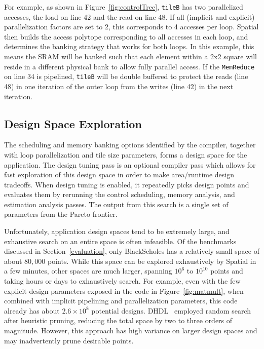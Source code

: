 {For example, as shown in Figure~\ref{fig:controlTree}, \texttt{\small{tileB}} has two parallelized accesses, the load on line 42 and the read on line 48. If all (implicit and explicit) parallelization factors are set to 2, this corresponds to 4 accesses per loop. Spatial then builds the access polytope corresponding to all accesses in each loop, and determines the banking strategy that works for both loops. In this example, this means the SRAM will be banked such that each element within a 2x2 square will reside
in a different physical bank to allow fully parallel access. If the \texttt{\small{MemReduce}} on line 34 is pipelined, \texttt{\small{tileB}} will be double buffered to protect the reads (line 48) in one iteration of the outer loop
from the writes (line 42) in the next iteration.







\subsection{Design Space Exploration}
\label{dse}
The scheduling and memory banking options identified by the compiler, together with loop parallelization and tile size parameters, forms a design space for the application.
The design tuning pass is an optional compiler pass which allows for fast exploration of this design space in order to make area/runtime design tradeoffs.
When design tuning is enabled, it repeatedly picks design points and evaluates them by rerunning the control scheduling, memory analysis, and estimation analysis passes. The output from this search is a single set of parameters from the Pareto frontier.

Unfortunately, application design spaces tend to be extremely large, and exhaustive search on an entire space is often infeasible. Of the benchmarks discussed in Section~\ref{evaluation},
only BlackScholes has a relatively small space of about $80,000$ points. While this space can be explored exhaustively by Spatial in a few minutes, other spaces are much larger, spanning $10^6$ to $10^{10}$ points and
taking hours or days to exhaustively search. For example, even with the few explicit design parameters exposed in the code in Figure~\ref{fig:matmult}, when combined with implicit pipelining and parallelization parameters, this code already has about $2.6\times10^8$ potential designs.
DHDL~\cite{dhdl} employed random search after heuristic pruning, reducing the total space by two to three orders of magnitude. However, this approach has high variance on larger design spaces and may inadvertently prune desirable points.

}
